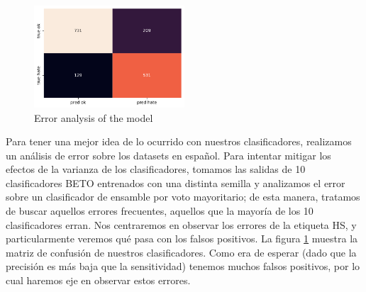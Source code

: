 
\begin{figure}[t]
    \centering
    \includegraphics[width=0.5\textwidth]{img/hateval_confusion_matrix.pdf}
    \caption{Error analysis of the model}
    \label{fig:hateval_error_analysis}
\end{figure}


Para tener una mejor idea de lo ocurrido con nuestros clasificadores, realizamos un análisis de error sobre los datasets en español. Para intentar mitigar los efectos de la varianza de los clasificadores, tomamos las salidas de 10 clasificadores BETO entrenados con una distinta semilla y analizamos el error sobre un clasificador de ensamble por voto mayoritario; de esta manera, tratamos de buscar aquellos errores frecuentes, aquellos que la mayoría de los 10 clasificadores erran. Nos centraremos en observar los errores de la etiqueta HS, y particularmente veremos qué pasa con los falsos positivos. La figura \ref{fig:hateval_error_analysis} muestra la matriz de confusión de nuestros clasificadores. Como era de esperar (dado que la precisión es más baja que la sensitividad) tenemos muchos falsos positivos, por lo cual haremos eje en observar estos errores.


